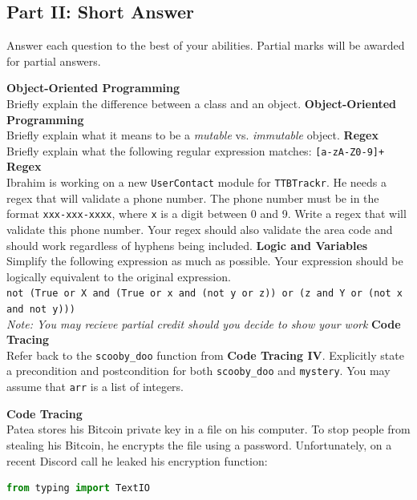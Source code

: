 \documentclass[letterpaper,12pt,addpoints]{exam}
\begin{document}
\begin{questions}
    \section*{Part II: Short Answer}
    Answer each question to the best of your abilities. Partial marks will be awarded for partial answers.

    \question[5] \textbf{Object-Oriented Programming} \\
    Briefly explain the difference between a class and an object.
    \bigskip
    \bigskip
    \bigskip
    \bigskip
    \question[5] \textbf{Object-Oriented Programming} \\
    Briefly explain what it means to be a \textit{mutable} vs. \textit{immutable} object.
    \bigskip
    \bigskip
    \bigskip
    \bigskip
    \question[5] \textbf{Regex} \\
    Briefly explain what the following regular expression matches: \texttt{[a-zA-Z0-9]+} %
    \bigskip
    \bigskip
    \bigskip
    \bigskip
    \question[5] \textbf{Regex} \\
    Ibrahim is working on a new \texttt{UserContact} module for \texttt{TTBTrackr}. He needs a regex that will validate a phone number. The phone number must be in the format \texttt{xxx-xxx-xxxx}, where \texttt{x} is a digit between 0 and 9. Write a regex that will validate this phone number. Your regex should also validate the area code and should work regardless of hyphens being included.
    \bigskip
    \bigskip
    \bigskip
    \bigskip
    \question[5] \textbf{Logic and Variables} \\
    Simplify the following expression as much as possible. Your expression should be logically equivalent to the original expression. \\
    \texttt{not (True or X and (True or x and (not y or z)) or (z and Y or (not x and not y)))
    } \\
    \textit{Note: You may recieve partial credit should you decide to show your work}
    \clearpage
    \question[10] \textbf{Code Tracing} \\
    Refer back to the \texttt{scooby\_doo} function from \textbf{Code Tracing IV}. Explicitly state a precondition and postcondition for both \texttt{scooby\_doo} and \texttt{mystery}. You may assume that \texttt{arr} is a list of integers.
    \bigskip
    \bigskip
    \bigskip
    \bigskip

    \question[10] \textbf{Code Tracing} \\
    Patea stores his Bitcoin private key in a file on his computer. To stop people from stealing his Bitcoin, he encrypts the file using a password. Unfortunately, on a recent Discord call he leaked his encryption function:
    \begin{lstlisting}[language=Python, style=mystyle]
from typing import TextIO


\end{lstlisting}
\end{questions}
\end{document}
